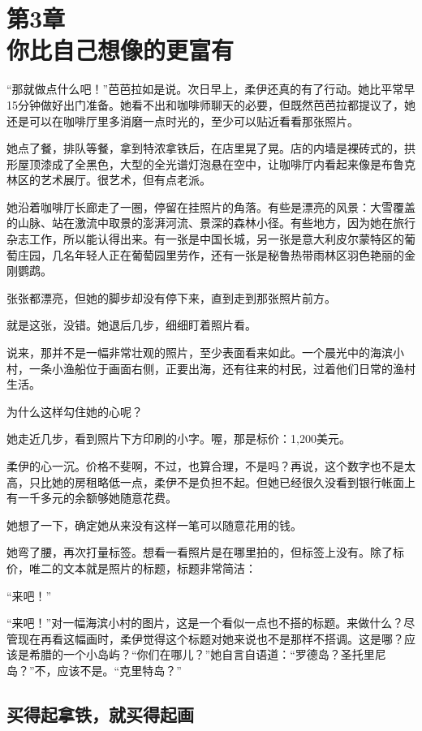 \section[第3章\q 你比自己想像的更富有]{第3章\\ 你比自己想像的更富有}
\label{sec:ch3}

“那就做点什么吧！”芭芭拉如是说。次日早上，柔伊还真的有了行动。她比平常早15分钟做好出门准备。她看不出和咖啡师聊天的必要，但既然芭芭拉都提议了，她还是可以在咖啡厅里多消磨一点时光的，至少可以贴近看看那张照片。

她点了餐，排队等餐，拿到特浓拿铁后，在店里晃了晃。店的内墙是裸砖式的，拱形屋顶漆成了全黑色，大型的全光谱灯泡悬在空中，让咖啡厅内看起来像是布鲁克林区的艺术展厅。很艺术，但有点老派。

她沿着咖啡厅长廊走了一圈，停留在挂照片的角落。有些是漂亮的风景：大雪覆盖的山脉、站在激流中取景的澎湃河流、景深的森林小径。有些地方，因为她在旅行杂志工作，所以能认得出来。有一张是中国长城，另一张是意大利皮尔蒙特区的葡萄庄园，几名年轻人正在葡萄园里劳作，还有一张是秘鲁热带雨林区羽色艳丽的金刚鹦鹉。

张张都漂亮，但她的脚步却没有停下来，直到走到那张照片前方。

就是这张，没错。她退后几步，细细盯着照片看。

说来，那并不是一幅非常壮观的照片，至少表面看来如此。一个晨光中的海滨小村，一条小渔船位于画面右侧，正要出海，还有往来的村民，过着他们日常的渔村生活。

为什么这样勾住她的心呢？

她走近几步，看到照片下方印刷的小字。喔，那是标价：1,200美元。

柔伊的心一沉。价格不斐啊，不过，也算合理，不是吗？再说，这个数字也不是太高，只比她的房租略低一点，柔伊不是负担不起。但她已经很久没看到银行帐面上有一千多元的余额够她随意花费。

她想了一下，确定她从来没有这样一笔可以随意花用的钱。

她弯了腰，再次打量标签。想看一看照片是在哪里拍的，但标签上没有。除了标价，唯二的文本就是照片的标题，标题非常简洁：

“来吧！”

“来吧！”对一幅海滨小村的图片，这是一个看似一点也不搭的标题。来做什么？尽管现在再看这幅画时，柔伊觉得这个标题对她来说也不是那样不搭调。这是哪？应该是希腊的一个小岛屿？“你们在哪儿？”她自言自语道：“罗德岛？圣托里尼岛？”不，应该不是。“克里特岛？”

\subsection{买得起拿铁，就买得起画}

